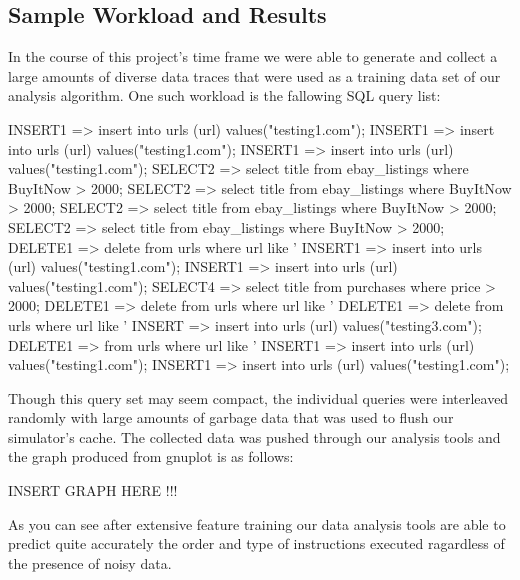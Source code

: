 \documentclass[11pt, oneside]{article}
\begin{document}
\subsection{Sample Workload and Results}
In the course of this project's time frame we were able to generate and collect
a large amounts of diverse data traces that were used as a training data set of
our analysis algorithm. One such workload is the fallowing SQL query list:

INSERT1 => insert into urls (url) values("testing1.com");
INSERT1 => insert into urls (url) values("testing1.com");
INSERT1 => insert into urls (url) values("testing1.com");
SELECT2 => select title from ebay_listings where BuyItNow > 2000;
SELECT2 => select title from ebay_listings where BuyItNow > 2000;
SELECT2 => select title from ebay_listings where BuyItNow > 2000;
SELECT2 => select title from ebay_listings where BuyItNow > 2000;
DELETE1 => delete from urls where url like '%
INSERT1 => insert into urls (url) values("testing1.com");
INSERT1 => insert into urls (url) values("testing1.com");
SELECT4 => select title from purchases where price > 2000;
DELETE1 => delete from urls where url like '%
DELETE1 => delete from urls where url like '%
INSERT => insert into urls (url) values("testing3.com");
DELETE1 => from urls where url like '%
INSERT1 => insert into urls (url) values("testing1.com");
INSERT1 => insert into urls (url) values("testing1.com");

Though this query set may seem compact, the individual queries were interleaved
randomly with large amounts of garbage data that was used to flush our simulator's
cache. The collected data was pushed through our analysis tools and the graph 
produced from gnuplot is as follows:

INSERT GRAPH HERE !!!

As you can see after extensive feature training our data analysis tools are able to
predict quite accurately the order and type of instructions executed ragardless of 
the presence of noisy data.
\end{document}
